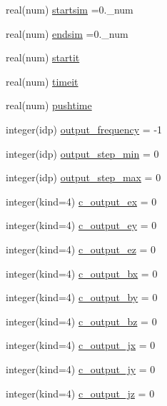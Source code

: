 \begin{DoxyCompactItemize}
\item 
real(num) \hyperlink{namespaceoutput__data_a3eebf5510f6656fe8385302d2aba28d5}{startsim} =0.\+\_\+num
\item 
real(num) \hyperlink{namespaceoutput__data_a1ed464801538daa68f0f138d06be9c8a}{endsim} =0.\+\_\+num
\item 
real(num) \hyperlink{namespaceoutput__data_a41d55c93b7330583e6a58d151f8d187b}{startit}
\item 
real(num) \hyperlink{namespaceoutput__data_adee8dc0fd9ff0328c325cfc24be39db3}{timeit}
\item 
real(num) \hyperlink{namespaceoutput__data_a1616b369a6e32a80c9448bff6371d1cf}{pushtime}
\item 
integer(idp) \hyperlink{namespaceoutput__data_aa9299257a58dc37dd6c11e96a637459a}{output\+\_\+frequency} = -\/1
\item 
integer(idp) \hyperlink{namespaceoutput__data_aea2eeeb3470d4377a87117bb1aeb2ae4}{output\+\_\+step\+\_\+min} = 0
\item 
integer(idp) \hyperlink{namespaceoutput__data_a310f5ada2926521513b808272a40764d}{output\+\_\+step\+\_\+max} = 0
\item 
integer(kind=4) \hyperlink{namespaceoutput__data_ad704ede81e5332d4c25944905c8848e5}{c\+\_\+output\+\_\+ex} = 0
\item 
integer(kind=4) \hyperlink{namespaceoutput__data_a086e752679ac4885a89e87ad1eb3d3e0}{c\+\_\+output\+\_\+ey} = 0
\item 
integer(kind=4) \hyperlink{namespaceoutput__data_a213388fbba34a6d586737464e84bde5c}{c\+\_\+output\+\_\+ez} = 0
\item 
integer(kind=4) \hyperlink{namespaceoutput__data_a5f179944d21e0cf92d3dc54e5ff559f6}{c\+\_\+output\+\_\+bx} = 0
\item 
integer(kind=4) \hyperlink{namespaceoutput__data_acae721d6bb12191afc82d055a51afaf0}{c\+\_\+output\+\_\+by} = 0
\item 
integer(kind=4) \hyperlink{namespaceoutput__data_a11a16bf36915b8e5de7c79bec86cf627}{c\+\_\+output\+\_\+bz} = 0
\item 
integer(kind=4) \hyperlink{namespaceoutput__data_ac03e40a616250af7bf99d35fd32f896a}{c\+\_\+output\+\_\+jx} = 0
\item 
integer(kind=4) \hyperlink{namespaceoutput__data_a257248d853fd4e17072ea40b6e9e261d}{c\+\_\+output\+\_\+jy} = 0
\item 
integer(kind=4) \hyperlink{namespaceoutput__data_a0fab0fe22c10bf3eca78d11dc8142679}{c\+\_\+output\+\_\+jz} = 0

\end{DoxyCompactItemize}
